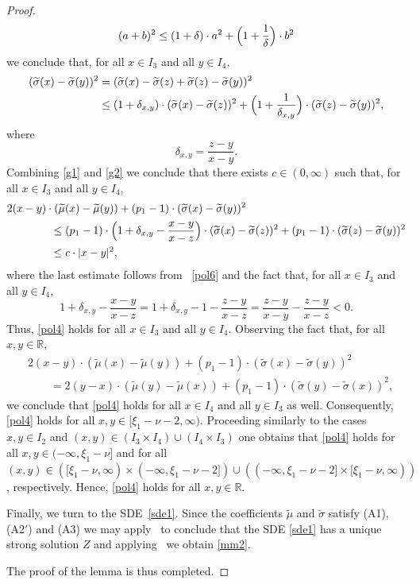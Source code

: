 \documentclass[11pt]{amsart}
\newcommand{\R}{{\mathbb R}}
\theoremstyle{plain}
\theoremstyle{definition}
\begin{document}
\begin{proof}
\begin{equation}\label{squares}
(a+b)^2\leq (1+\delta)\cdot a^2+ \Bigl(1+\frac{1}{\delta}\Bigr)\cdot b^2
\end{equation}
we conclude that, for all $x\in I_3$ and all $y\in I_4$,
\begin{equation}\label{g2}
\begin{aligned}
(\widetilde\sigma(x)-\widetilde\sigma(y))^2&=
 (\widetilde\sigma(x)-\widetilde\sigma(z)+\widetilde\sigma(z)-\widetilde\sigma(y))^2\\
 &\leq (1+\delta_{x,y})\cdot (\widetilde\sigma(x)-\widetilde\sigma(z))^2+\Bigl(1+\frac{1}{\delta_{x,y}}\Bigr)\cdot (\widetilde\sigma(z)-\widetilde\sigma(y))^2,
\end{aligned}
\end{equation}
where
\[
\delta_{x,y}=\frac{z-y}{x-y}.
\]
Combining \eqref{g1} and \eqref{g2} we conclude that there exists $c\in (0, \infty)$ such that, for all $x\in I_3$ and all $y\in I_4$,
\begin{align*}
&2(x-y)\cdot (\widetilde\mu(x)-\widetilde\mu(y))+(p_1-1)\cdot (\widetilde\sigma(x)-\widetilde\sigma(y))^2\\
&\qquad\qquad\leq (p_1-1)\cdot \Bigl(1+\delta_{x,y}-\frac{x-y}{x-z}\Bigr)\cdot (\widetilde\sigma(x)-\widetilde\sigma(z))^2 +(p_1-1)\cdot  (\widetilde\sigma(z)-\widetilde\sigma(y))^2\\
& \qquad\qquad
\le c\cdot |x-y|^2,
\end{align*}
where the last estimate follows from ~\eqref{pol6} and the fact that, for all $x\in I_3$ and all $y\in I_4$,
\[
1+\delta_{x,y}-\frac{x-y}{x-z}=1+\delta_{x,y}-1-\frac{z-y}{x-z}=\frac{z-y}{x-y}-\frac{z-y}{x-z}<0.
\]
Thus,
\eqref{pol4} holds for all $x\in I_3$ and all $y\in I_4$. Observing the fact that, for all $x,y\in\R$,
\begin{align*}
&2(x-y)\cdot(\widetilde\mu(x)-\widetilde\mu(y))+(p_1-1)\cdot (\widetilde\sigma(x)-\widetilde\sigma(y))^2\\
&\qquad=2(y-x)\cdot(\widetilde\mu(y)-\widetilde\mu(x))+(p_1-1)\cdot (\widetilde\sigma(y)-\widetilde\sigma(x))^2,
\end{align*}
we conclude that \eqref{pol4} holds for all $x\in I_4$ and all $y\in I_3$ as well. Consequently, \eqref{pol4} holds for all $x,y\in [\xi_1-\nu-2, \infty)$. Proceeding
similarly to the cases $x, y\in I_2$ and $(x,y)\in ( I_3\times I_4)\cup( I_4\times I_3)$
one obtains that \eqref{pol4} holds for all $x,y\in (-\infty, \xi_1-\nu]$ and for all
$(x,y)\in ([\xi_1-\nu, \infty)\times (-\infty, \xi_1-\nu-2])\cup( (-\infty, \xi_1-\nu-2]\times  [\xi_1-\nu, \infty)) $,
respectively. Hence, \eqref{pol4} holds for all $x,y\in\R$.

Finally, we turn to the SDE~\eqref{sde1}. Since the coefficients $\widetilde\mu$ and $\widetilde\sigma$ satisfy (A1), (A2$'$) and (A3) we may
 apply~\cite[Theorem 2.3.6]{Mao08} to conclude that the SDE \eqref{sde1} has a unique strong solution $Z$
and applying~\cite[Theorem 2.4.1]{Mao08} we obtain \eqref{mm2}.

The proof of the lemma is thus completed.
\end{proof}
\end{document}

